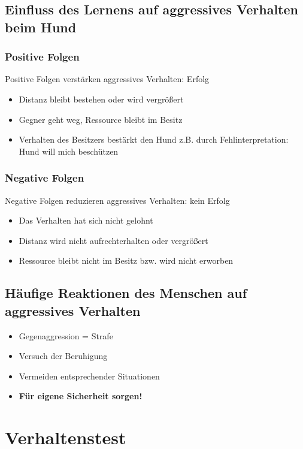     \subsection{Einfluss des Lernens auf aggressives Verhalten beim Hund}
        \subsubsection{Positive Folgen}
            Positive Folgen verstärken aggressives Verhalten: Erfolg
            \begin{itemize}
                \item Distanz bleibt bestehen oder wird vergrößert
                \item Gegner geht weg, Ressource bleibt im Besitz
                \item Verhalten des Besitzers bestärkt den Hund z.B. durch Fehlinterpretation: \glqq Hund will mich beschützen\grqq{}{}
            \end{itemize}
        \subsubsection{Negative Folgen}
            Negative Folgen reduzieren aggressives Verhalten: kein Erfolg
            \begin{itemize}
                \item Das Verhalten hat sich nicht gelohnt
                \item Distanz wird nicht aufrechterhalten oder vergrößert
                \item Ressource bleibt nicht im Besitz bzw. wird nicht erworben
            \end{itemize}

    \subsection{Häufige Reaktionen des Menschen auf aggressives Verhalten}
        \begin{itemize}
            \item Gegenaggression = Strafe
            \item Versuch der \glqq Beruhigung\grqq{}{}
            \item Vermeiden entsprechender Situationen
            \item \textbf{Für eigene Sicherheit sorgen!}
        \end{itemize}

\section{Verhaltenstest}
